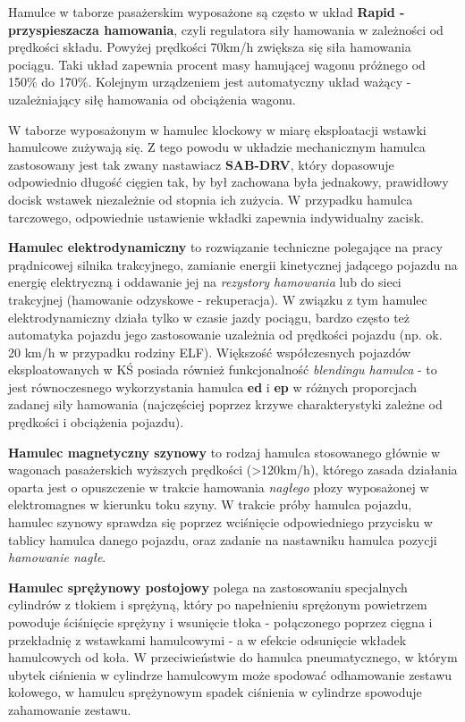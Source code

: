 Hamulce w taborze pasażerskim wyposażone są często w układ \textbf{Rapid - przyspieszacza hamowania}, czyli regulatora siły hamowania w zależności od prędkości składu. Powyżej prędkości 70km/h zwiększa się siła hamowania pociągu. Taki układ zapewnia procent masy hamującej wagonu próżnego od 150\% do 170\%. Kolejnym urządzeniem jest automatyczny układ ważący - uzależniający siłę hamowania od obciążenia wagonu.

W taborze wyposażonym w hamulec klockowy w miarę eksploatacji wstawki hamulcowe zużywają się. Z tego powodu w układzie mechanicznym hamulca zastosowany jest tak zwany nastawiacz \textbf{SAB-DRV}, który dopasowuje odpowiednio długość cięgien tak, by był zachowana była jednakowy, prawidłowy docisk wstawek niezależnie od stopnia ich zużycia. W przypadku hamulca tarczowego, odpowiednie ustawienie wkładki zapewnia indywidualny zacisk.

\textbf{Hamulec elektrodynamiczny} to rozwiązanie techniczne polegające na pracy prądnicowej silnika trakcyjnego, zamianie energii kinetycznej jadącego pojazdu na energię elektryczną i oddawanie jej na \textit{rezystory hamowania} lub do sieci trakcyjnej (hamowanie odzyskowe - rekuperacja). W związku z tym hamulec elektrodynamiczny działa tylko w czasie jazdy pociągu, bardzo często też automatyka pojazdu jego zastosowanie uzależnia od prędkości pojazdu (np. ok. 20 km/h w przypadku rodziny ELF). Większość współczesnych pojazdów eksploatowanych w KŚ posiada również funkcjonalność \textit{blendingu hamulca} - to jest równoczesnego wykorzystania hamulca \textbf{ed} i \textbf{ep} w różnych proporcjach zadanej siły hamowania (najczęściej poprzez krzywe charakterystyki zależne od prędkości i obciążenia pojazdu).

\textbf{Hamulec magnetyczny szynowy} to rodzaj hamulca stosowanego głównie w wagonach pasażerskich wyższych prędkości (>120km/h), którego zasada działania oparta jest o opuszczenie w trakcie hamowania \textit{nagłego} płozy wyposażonej w elektromagnes w kierunku toku szyny. W trakcie próby hamulca pojazdu, hamulec szynowy sprawdza się poprzez wciśnięcie odpowiedniego przycisku w tablicy hamulca danego pojazdu, oraz zadanie na nastawniku hamulca pozycji \textit{hamowanie nagłe}.

\textbf{Hamulec sprężynowy postojowy} polega na zastosowaniu specjalnych cylindrów z tłokiem i sprężyną, który po napełnieniu sprężonym powietrzem powoduje ściśnięcie sprężyny i wsunięcie tłoka - połączonego poprzez cięgna i przekładnię z wstawkami hamulcowymi - a w efekcie odsunięcie wkładek hamulcowych od koła. W przeciwieństwie do hamulca pneumatycznego, w którym ubytek ciśnienia w cylindrze hamulcowym może spodować odhamowanie zestawu kołowego, w hamulcu sprężynowym spadek ciśnienia w cylindrze spowoduje zahamowanie zestawu.

